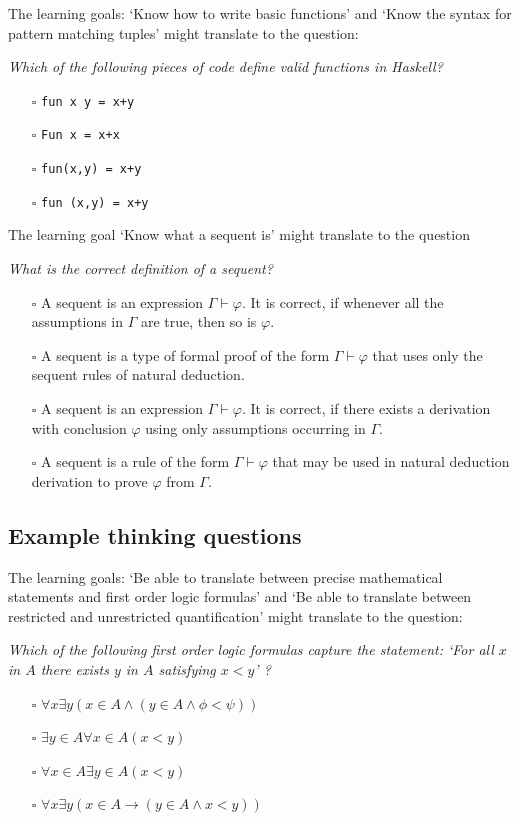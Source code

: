 \documentclass{article}[12pt]
\begin{document}
The learning goals: `Know how to write basic functions' and `Know the syntax for pattern matching tuples' might translate to the question:

\emph{Which of the following pieces of code define valid functions in Haskell?}
\begin{itemize}
    \item[$\square$] \verb|fun x y = x+y|
    \item[$\square$] \verb|Fun x = x+x|
    \item[$\square$] \verb|fun(x,y) = x+y|
    \item[$\square$] \verb|fun (x,y) = x+y|
\end{itemize}

The learning goal `Know what a sequent is' might translate to the question

\emph{What is the correct definition of a sequent?}
\begin{itemize}
    \item[$\square$] A sequent is an expression $\Gamma \vdash \varphi$. It is correct, if whenever all the assumptions in $\Gamma$ are true, then so is $\varphi$.
    \item[$\square$]  A sequent is a type of formal proof of the form $\Gamma \vdash \varphi$ that uses only the sequent rules of natural deduction.
    \item[$\square$] A sequent is an expression $\Gamma \vdash \varphi$. It is correct, if there exists a derivation with conclusion $\varphi$ using only assumptions occurring in $\Gamma$.
    \item[$\square$]  A sequent is a rule of the form $\Gamma \vdash \varphi$ that may be used in natural deduction derivation to prove $\varphi$ from $\Gamma$.
\end{itemize}

\subsection{Example thinking questions}
The learning goals: `Be able to translate between precise mathematical statements and first order logic formulas' and `Be able to translate between restricted and unrestricted quantification' might translate to the question:

\emph{Which of the following first order logic formulas capture the statement: `For all $x$ in $A$ there exists $y$ in $A$ satisfying $x < y$' ?}
\begin{itemize}
    \item[$\square$] $ \forall x \exists y ( x \in A \wedge (y \in A \wedge \phi < \psi)) $
    \item[$\square$] $ \exists y \in A \forall x \in A (x < y) $ 
    \item[$\square$] $ \forall x \in A \exists y \in A (x < y) $
    \item[$\square$] $ \forall x \exists y (x \in A \rightarrow (y \in A \wedge x < y)) $
\end{itemize}
\end{document}
